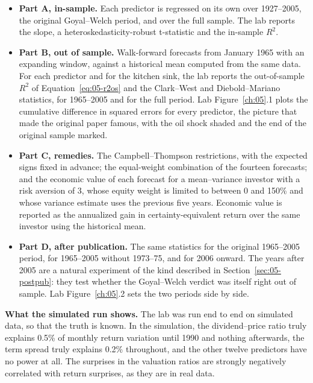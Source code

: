 \begin{itemize}
  \item \textbf{Part A, in-sample.} Each predictor is regressed on its own over 1927--2005, the original Goyal--Welch period, and over the full sample. The lab reports the slope, a heteroskedasticity-robust t-statistic and the in-sample $R^2$.
  \item \textbf{Part B, out of sample.} Walk-forward forecasts from January 1965 with an expanding window, against a historical mean computed from the same data. For each predictor and for the kitchen sink, the lab reports the out-of-sample $R^2$ of Equation~\eqref{eq:05-r2os} and the Clark--West and Diebold--Mariano statistics, for 1965--2005 and for the full period. Lab Figure~\ref{ch:05}.1 plots the cumulative difference in squared errors for every predictor, the picture that made the original paper famous, with the oil shock shaded and the end of the original sample marked.
  \item \textbf{Part C, remedies.} The Campbell--Thompson restrictions, with the expected signs fixed in advance; the equal-weight combination of the fourteen forecasts; and the economic value of each forecast for a mean--variance investor with a risk aversion of 3, whose equity weight is limited to between 0 and 150\% and whose variance estimate uses the previous five years. Economic value is reported as the annualized gain in certainty-equivalent return over the same investor using the historical mean.
  \item \textbf{Part D, after publication.} The same statistics for the original 1965--2005 period, for 1965--2005 without 1973--75, and for 2006 onward. The years after 2005 are a natural experiment of the kind described in Section~\ref{sec:05-postpub}: they test whether the Goyal--Welch verdict was itself right out of sample. Lab Figure~\ref{ch:05}.2 sets the two periods side by side.
\end{itemize}

\textbf{What the simulated run shows.} The lab was run end to end on simulated data, so that the truth is known. In the simulation, the dividend--price ratio truly explains 0.5\% of monthly return variation until 1990 and nothing afterwards, the term spread truly explains 0.2\% throughout, and the other twelve predictors have no power at all. The surprises in the valuation ratios are strongly negatively correlated with return surprises, as they are in real data.

